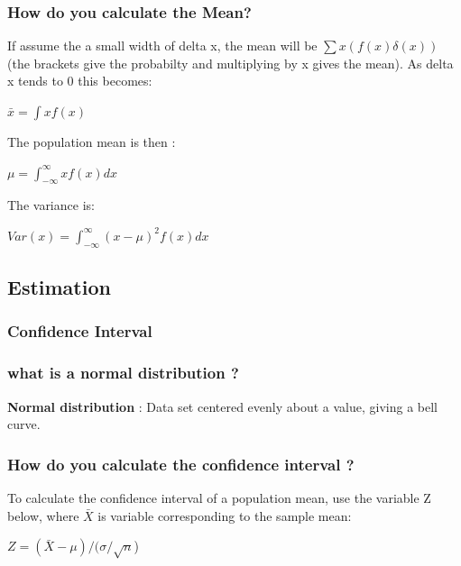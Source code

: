 \documentclass[
]{article}
\begin{document}
\hypertarget{how-do-you-calculate-the-mean}{%
\subsubsection{How do you calculate the
Mean?}\label{how-do-you-calculate-the-mean}}

If assume the a small width of delta x, the mean will be
\(\sum x(f(x)\delta(x))\) (the brackets give the probabilty and
multiplying by x gives the mean). As delta x tends to 0 this becomes:

\(\bar{x} = \int xf(x)\)

The population mean is then :

\(\mu = \int_{-\infty}^{\infty} xf(x) dx\)

The variance is:

\(Var(x) = \int_{-\infty}^{\infty} (x -\mu)^2 f(x) dx\)

\hypertarget{estimation}{%
\subsection{Estimation}\label{estimation}}

\hypertarget{confidence-interval}{%
\subsubsection{Confidence Interval}\label{confidence-interval}}

\hypertarget{what-is-a-normal-distribution}{%
\subsubsection{what is a normal distribution
?}\label{what-is-a-normal-distribution}}

\textbf{Normal distribution} : Data set centered evenly about a value,
giving a bell curve.

\hypertarget{how-do-you-calculate-the-confidence-interval}{%
\subsubsection{How do you calculate the confidence interval
?}\label{how-do-you-calculate-the-confidence-interval}}

To calculate the confidence interval of a population mean, use the
variable Z below, where \(\bar{X}\) is variable corresponding to the
sample mean:

\(Z = (\bar{X} - \mu)/ (\sigma/ \sqrt{n}\))
\end{document}
